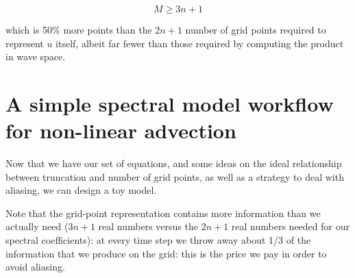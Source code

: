 \begin{definition}
	\begin{equation}
		M \ge 3n+1
	\end{equation}
	\end{definition}

	which is 50\% more points than the $2n+1$ number of grid points required to represent $u$ itself, albeit far fewer than those required by computing the product in wave space.

\section{A simple spectral model workflow for non-linear advection}
Now that we have our set of equations, and some ideas on the ideal relationship between truncation and number of grid points, as well as a strategy to deal with aliasing, we can design a toy model.


Note that the grid-point representation contains more information than we actually need ($3n+1$ real numbers versus the $2n+1$ real numbers needed for our spectral coefficients): at every time step we throw away about 1/3 of the information that we produce on the grid: this is the price we pay in order to avoid aliasing.

